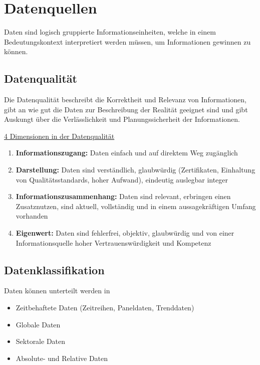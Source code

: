 %
%
%
%

\section{Datenquellen}
\label{sec:datenquellen}

Daten sind logisch gruppierte Informationseinheiten, welche in einem Bedeutungskontext interpretiert werden müssen, um Informationen gewinnen zu können.

\subsection{Datenqualität}
\label{sec:datenqualität}

Die Datenqualität beschreibt die Korrektheit und Relevanz von Informationen, gibt an wie gut die Daten zur Beschreibung der Realität geeignet sind und gibt Auskungt über die Verlässlichkeit und Planungssicherheit der Informationen.

\underline{4 Dimensionen in der Datenqualität}
    \begin{enumerate}
        \item \textbf{Informationszugang:} Daten einfach und auf direktem Weg zugänglich   
        \item \textbf{Darstellung:} Daten sind verständlich, glaubwürdig (Zertifikaten, Einhaltung von Qualitätsstandards, hoher Aufwand), eindeutig auslegbar integer
        \item \textbf{Informationszusammenhang:} Daten sind relevant, erbringen einen Zusatznutzen, sind aktuell, vollständig und in einem aussagekräftigen Umfang vorhanden
        \item \textbf{Eigenwert:} Daten sind fehlerfrei, objektiv, glaubwürdig und von einer Informationsquelle hoher Vertrauenswürdigkeit und Kompetenz
    \end{enumerate}

\subsection{Datenklassifikation}
\label{sec: datenklassifikation}

Daten können unterteilt werden in
\begin{itemize}
    \item Zeitbehaftete Daten (Zeitreihen, Paneldaten, Trenddaten)
    \item Globale Daten
    \item Sektorale Daten
    \item Absolute- und Relative Daten
\end{itemize}

